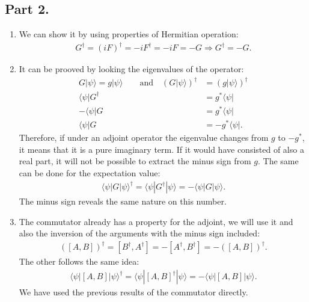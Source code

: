 \documentclass[letterpaper,11pt,twoside]{article}
\newcommand{\ket}[1]{|#1\rangle}
\newcommand{\bra}[1]{\langle#1|}
\newcommand{\braket}[1]{\langle#1\rangle}
\begin{document}
\subsection*{Part 2.}
\begin{enumerate}[itemsep=0pt,topsep=0pt,label=\alph*)]
  \item We can show it by using properties of Hermitian operation:
  \begin{align*}
      G^\dagger=(iF)^\dagger=-iF^\dagger=-iF=-G\Longrightarrow G^\dagger=-G.
  \end{align*}
  \item It can be prooved by looking the eigenvalues of the operator:
  \begin{align*}
    G\ket{\psi}=g\ket{\psi}\qquad\text{and}\quad(G\ket{\psi})^\dagger&=(g\ket{\psi})^\dagger\\
    \bra{\psi}G^\dagger&=g^*\bra{\psi}\\
    -\bra{\psi}G&=g^*\bra{\psi}\\
    \bra{\psi}G&=-g^*\bra{\psi}.
  \end{align*}
  Therefore, if under an adjoint operator the eigenvalue changes from $g$ to $-g^*$, it means that it is a pure imaginary term. If it would have consisted of also a real part,
  it will not be possible to extract the minus sign from $g$. The same can be done for the expectation value:
  \begin{align*}
    \braket{\psi|G|\psi}^\dagger=\braket{\psi|G^\dagger|\psi}=-\braket{\psi|G|\psi}.
  \end{align*}
  The minus sign reveals the same nature on this number.
  \item The commutator already has a property for the adjoint, we will use it and also the inversion of the arguments with the minus sign included:
  \begin{align*}
    ([A,B])^\dagger=[B^\dagger,A^\dagger]=-[A^\dagger,B^\dagger]=-([A,B])^\dagger.
  \end{align*}
  The other follows the same idea:
  \begin{align*}
    \braket{\psi|[A,B]|\psi}^\dagger=\braket{\psi|[A,B]^\dagger|\psi}=-\braket{\psi|[A,B]|\psi}.
  \end{align*}
  We have used the previous results of the commutator directly.
\end{enumerate}

%
\end{document}
